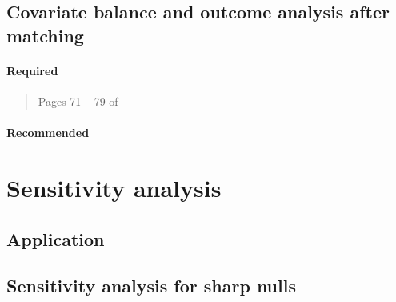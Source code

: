 \documentclass[12pt]{article}
\begin{document}
\subsection{Covariate balance and outcome analysis after matching}

\paragraph*{Required}

\begin{verse}
\end{verse}

\begin{verse}
 Pages 71 -- 79 of 
\end{verse}

\paragraph*{Recommended}

\begin{verse}
\end{verse}

\begin{verse}
\end{verse}

\begin{verse}
\end{verse}

\begin{verse}
\end{verse}

\section{Sensitivity analysis}

\subsection*{Application}

\begin{verse}  \end{verse}

\subsection{Sensitivity analysis for sharp nulls}
\end{document}
